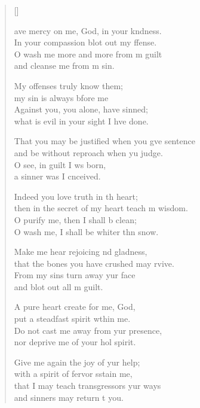 \settowidth{\versewidth}{That you may be justified when you give sentence *}
\begin{verse}[\versewidth]
  \begin{patverse}
    ave mercy on me, God, in your k\pointup{\i}ndness.\Med\\
In your compassion blot out my ffense.\\
O wash me more and more from m guilt\Med\\
and cleanse me from m sin.

My offenses truly  know them;\Med\\
my sin is always bfore me\\
Against you, you alone, have  sinned;\Med\\
what is evil in your sight I hve done.

That you may be justified when you g\pointup{\i}ve sentence\Med\\
and be without reproach when yu judge.\\
O see, in guilt I ws born,\Med\\
a sinner was I cnceived.

Indeed you love truth in th heart;\Med\\
then in the secret of my heart teach m wisdom.\\
O purify me, then I shall b clean;\Med\\
O wash me, I shall be whiter thn snow.

Make me hear rejoicing nd gladness,\Med\\
that the bones you have crushed may rvive.\\
From my sins turn away yur face\Med\\
and blot out all m guilt.

A pure heart create for me,  God,\Med\\
put a steadfast spirit w\pointup{\i}thin me.\\
Do not cast me away from yur presence,\Med\\
nor deprive me of your hol spirit.

Give me again the joy of yur help;\Med\\
with a spirit of fervor sstain me,\\
that I may teach transgressors yur ways\Med\\
and sinners may return t you.


\end{patverse}
\end{verse}
